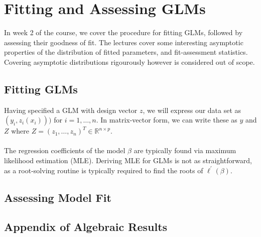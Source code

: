 
\section{Fitting and Assessing GLMs}
In week 2 of the course, we cover the procedure for fitting GLMs, followed by assessing their goodness of fit. The lectures cover some interesting asymptotic properties of the distribution of fitted parameters, and fit-assessment statistics. Covering asymptotic distributions rigourously however is considered out of scope.

\subsection{Fitting GLMs}
Having specified a GLM with design vector $z$, we will express our data set as $(y_i, z_i(x_i)))$ for $i=1,\dots,n$. In matrix-vector form, we can write these as $y$ and $Z$ where $Z = (z_1, \dots, z_n)^T\in\mathbb{R}^{n\times p}$. \\
\\
The regression coefficients of the model $\beta$ are typically found via maximum likelihood estimation (MLE). Deriving MLE for GLMs is not as straightforward, as a root-solving routine is typically required to find the roots of $\ell^\prime(\beta)$.

\begin{definition}
    
\end{definition}


\subsection{Assessing Model Fit}


\subsection{Appendix of Algebraic Results}
